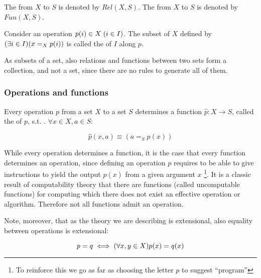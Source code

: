 
The  from $X$ to $S$ is denoted by
$Rel(X, S)$.  The  from \(X\) to
\(S\) is denoted by \(Fun(X, S)\).

Consider an operation $p(i) \in X \; (i \in I)$. The subset of $X$ defined
by $(\exists i \in I)(x =_X p(i))$ is called the  of \(I\)
along \(p\).

As subsets of a set, also relations and functions between two sets
form a collection, and not a set, since there are no rules to
generate all of them.

\subsubsection{Operations and functions}

Every operation \(p\) from a set \(X\) to a set \(S\) determines a
function \(\hat{p} : X \rightarrow S\), called the  of
\(p\), s.t. .  $\forall x \in X, a \in S$:

\[ \hat{p}(x,a) \equiv (a =_S p(x))\]

While every operation determines a function, it is  the case that
every function determines an operation, since defining an operation $p$ requires
to be able to give instructions to yield the output $p(x)$ from a given argument
$x$
\footnote{To reinforce this we go as far as choosing the letter $p$ to suggest
  ``program''}.
It is a classic result of computability theory that there are
functions (called uncomputable functions) for computing which there
does not exist an effective operation or algorithm. Therefore not all
functions admit an operation.

Note, moreover, that as the theory we are describing is extensional, also
equality between operations is extensional:

\[
  p = q \iff (\forall x,y \in X)p(x) = q(x)
\]

